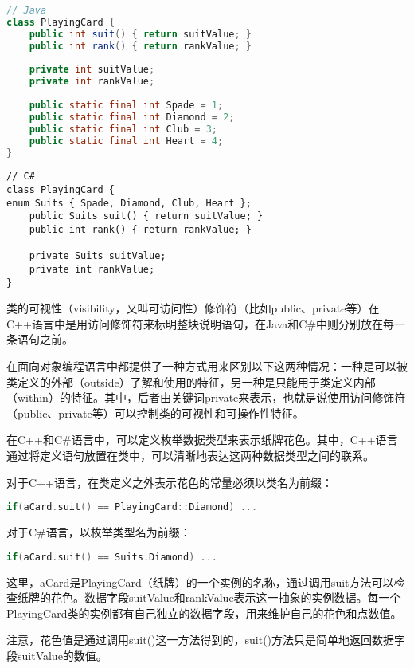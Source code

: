 \begin{lstlisting}[language=Java]
// Java 
class PlayingCard {
	public int suit() { return suitValue; }
	public int rank() { return rankValue; }
	
	private int suitValue;
	private int rankValue;
	
	public static final int Spade = 1;
	public static final int Diamond = 2;
	public static final int Club = 3;
	public static final int Heart = 4;
}
\end{lstlisting}



\begin{lstlisting}[language={[Sharp]C}]
// C#
class PlayingCard {
enum Suits { Spade, Diamond, Club, Heart };
	public Suits suit() { return suitValue; }
	public int rank() { return rankValue; }
	
	private Suits suitValue;
	private int rankValue;
}
\end{lstlisting}


类的可视性（visibility，又叫可访问性）修饰符（比如public、private等）在C++语言中是用访问修饰符来标明整块说明语句，在Java和C\#中则分别放在每一条语句之前。

在面向对象编程语言中都提供了一种方式用来区别以下这两种情况：一种是可以被类定义的外部（outside）了解和使用的特征，另一种是只能用于类定义内部（within）的特征。其中，后者由关键词private来表示，也就是说使用访问修饰符（public、private等）可以控制类的可视性和可操作性特征。


在C++和C\#语言中，可以定义枚举数据类型来表示纸牌花色。其中，C++语言通过将定义语句放置在类中，可以清晰地表达这两种数据类型之间的联系。

对于C++语言，在类定义之外表示花色的常量必须以类名为前缀：

\begin{lstlisting}[language=C++]
if(aCard.suit() == PlayingCard::Diamond) ...
\end{lstlisting}

对于C\#语言，以枚举类型名为前缀：


\begin{lstlisting}[language=C++]
if(aCard.suit() == Suits.Diamond) ...
\end{lstlisting}

这里，aCard是PlayingCard（纸牌）的一个实例的名称，通过调用suit方法可以检查纸牌的花色。数据字段suitValue和rankValue表示这一抽象的实例数据。每一个PlayingCard类的实例都有自己独立的数据字段，用来维护自己的花色和点数值。

注意，花色值是通过调用suit()这一方法得到的，suit()方法只是简单地返回数据字段suitValue的数值。

